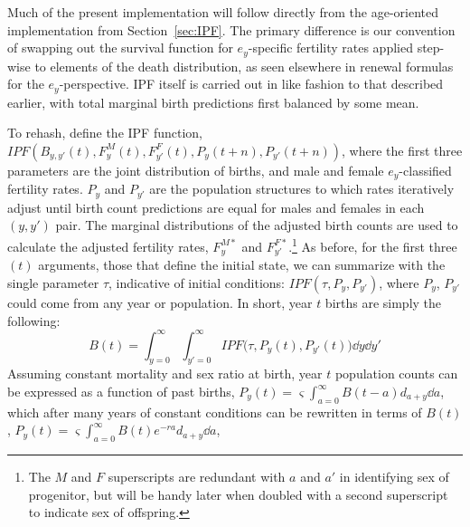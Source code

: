 
Much of the present implementation will follow directly from the age-oriented
implementation from Section~\ref{sec:IPF}. The primary difference is our
convention of swapping out the survival function for $e_y$-specific fertility
rates applied step-wise to elements of the death distribution, as seen elsewhere
in renewal formulas for the $e_y$-perspective. IPF itself is carried out in like
fashion to that described earlier, with total marginal birth predictions
first balanced by some mean. 

To rehash, define the IPF function,
$IPF(B_{y,y'}(t), F_y^M(t), F_{y'}^F(t),P_y(t+n),P_{y'}(t+n))$, where the first
three parameters are the joint distribution of births, and male and female
$e_y$-classified fertility rates. $P_y$ and $P_{y'}$ are the population
structures to which rates iteratively adjust until birth count predictions
are equal for males and females in each $(y,y')$ pair. The marginal distributions of
the adjusted birth counts are used to calculate the adjusted fertility rates,
$F_y^{M\ast}$ and $F_{y'}^{F\ast}$.\footnote{The $M$ and $F$ superscripts are
redundant with $a$ and $a'$ in identifying sex of progenitor, but will be handy
later when doubled with a second superscript to indicate sex of offspring.} As
before, for the first three $(t)$ arguments, those that define the initial
state, we can summarize with the single parameter $\tau$, indicative of initial
conditions: $IPF(\tau,P_y, P_{y'})$, where $P_y$, $P_{y'}$ could come from any
year or population. In short, year $t$ births are simply the following:
\begin{equation}
B(t) = \int _{y=0}^\infty \int _{y'=0}^\infty IPF\Big(\tau,P_y(t),
P_{y'}(t)\Big) \dd y \dd y'
\end{equation}
Assuming constant mortality and sex ratio at birth, year $t$ population counts
can be expressed as a function of past births, $P_y(t) =
\varsigma \int_{a=0}^\infty B(t-a)d_{a+y} \dd a$, which after many years of
constant conditions can be rewritten in terms of $B(t)$, $P_y(t) =
\varsigma \int_{a=0}^\infty B(t)e^{-ra}d_{a+y} \dd a$,

